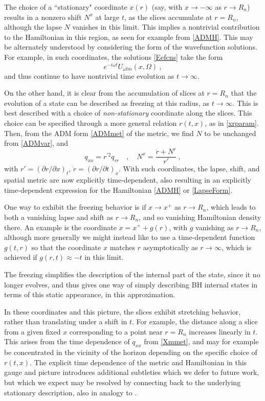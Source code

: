 \documentclass[12pt]{article}
\numberwithin{equation}{section}
\newcommand{\beq}{\begin{equation}}
\newcommand{\eeq}{\end{equation}}
\begin{document}
The choice of a ``stationary" coordinate $x(r)$ (say, with $x\rightarrow -\infty$ as $r\rightarrow R_n$) results in a nonzero shift $N^x$ at large $t$, as the slices accumulate at $r=R_n$, although the lapse $N$ vanishes in this limit.  This implies a nontrivial contribution to the Hamiltonian in this region, as seen for example from \eqref{ADMH}.  This may be alternately understood by considering the form of the wavefunction solutions.  For example, in such coordinates, the solutions \eqref{Eefcns} take the form 
\beq
e^{-i\omega t} U_{\omega lm}(x,\Omega)\ ,
\eeq
and thus continue to have nontrivial time evolution as $t\rightarrow\infty$.

On the other hand, it is clear from the accumulation of slices at $r=R_n$ that the evolution of a state can be described as freezing\cite{QBHB}\cite{BHQIUE} at this radius, as $t\rightarrow \infty$.  This is best described with a choice of {\it non-stationary} coordinate along the slices.  This choice can be specified through a more general relation $r(t,x)$, as in \eqref{xrparam}.  Then, from the ADM form \eqref{ADMmet} of the metric, we find $N$ to be unchanged from \eqref{ADMvar}, and
\beq\label{Xmmet}
q_{xx}=r^{\prime 2} q_{rr}\quad ,\quad N^x = \frac{\dot r + N^r}{r'}\ ,
\eeq
with $r'=(\partial r/\partial x)_t$, $\dot r= (\partial r/\partial t)_x$.  With such coordinates, the lapse, shift, and spatial metric are now explicitly time-dependent, also resulting in an explicitly time-dependent expression for the Hamiltonian \eqref{ADMH} or \eqref{LapseForm}.  

One way to exhibit the freezing behavior is if $x\rightarrow x^+$ as $r\rightarrow R_n$, which leads to both a vanishing lapse and shift as $r\rightarrow R_n$, and so vanishing Hamiltonian density there.  An example\cite{SE2d} is the coordinate $x=x^+ + g(r)$, with $g$ vanishing as $r\rightarrow R_n$, although more generally we might  instead like to use a time-dependent function $g(t,r)$ so that the coordinate $x$ matches $r$ asymptotically as $r\rightarrow\infty$, which is achieved if $g(r,t)\approx -t$ in this limit.  

The freezing simplifies the description of the internal part of the state, since it no longer evolves, and thus gives one way of simply describing BH internal states in terms of this static appearance, in this approximation.  

In these coordinates and this picture, the slices exhibit stretching behavior, rather than translating under a shift in $t$.  For example, the distance along a slice from a given fixed $x$ corresponding to a point near $r=R_n$ increases linearly in $t$.  This arises from the time dependence of $q_{xx}$ from \eqref{Xmmet}, and may for example be concentrated in the vicinity of the horizon depending on the specific choice of $r(t,x)$.  
 The explicit time dependence of the metric and Hamiltonian in this gauge  and picture introduces additional subtleties which we defer to future work, but which we expect may be resolved by connecting back to the underlying stationary description, also in analogy to \cite{MuOe}.  
\end{document}

